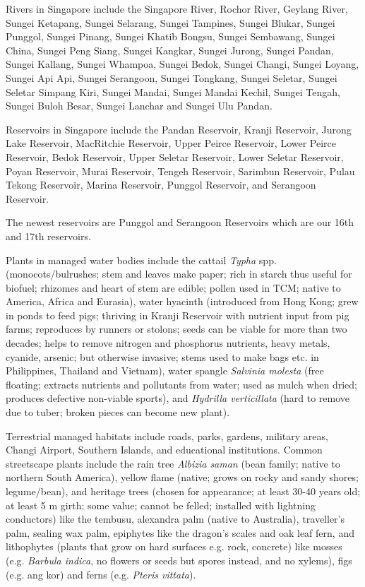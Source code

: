 \documentclass{slnotes}
\newcommand{\scn}[1]{\textit{#1}}
\begin{document}
Rivers in Singapore include the Singapore River, Rochor River, Geylang River, Sungei Ketapang, Sungei Selarang, Sungei Tampines, Sungei Blukar, Sungei Punggol, Sungei Pinang, Sungei Khatib Bongsu, Sungei Sembawang, Sungei China, Sungei Peng Siang, Sungei Kangkar, Sungei Jurong, Sungei Pandan, Sungei Kallang, Sungei Whampoa, Sungei Bedok, Sungei Changi, Sungei Loyang, Sungei Api Api, Sungei Serangoon, Sungei Tongkang, Sungei Seletar, Sungei Seletar Simpang Kiri, Sungei Mandai, Sungei Mandai Kechil, Sungei Tengah, Sungei Buloh Besar, Sungei Lanchar and Sungei Ulu Pandan.

Reservoirs in Singapore include the Pandan Reservoir, Kranji Reservoir, Jurong Lake Reservoir, MacRitchie Reservoir, Upper Peirce Reservoir, Lower Peirce Reservoir, Bedok Reservoir, Upper Seletar Reservoir, Lower Seletar Reservoir, Poyan Reservoir, Murai Reservoir, Tengeh Reservoir, Sarimbun Reservoir, Pulau Tekong Reservoir, Marina Reservoir, Punggol Reservoir, and Serangoon Reservoir.

The newest reservoirs are Punggol and Serangoon Reservoirs which are our 16th and 17th reservoirs.

Plants in managed water bodies include the cattail \scn{Typha} spp. (monocots/bulrushes; stem and leaves make paper; rich in starch thus useful for biofuel; rhizomes and heart of stem are edible; pollen used in TCM; native to America, Africa and Eurasia), water hyacinth (introduced from Hong Kong; grew in ponds to feed pigs; thriving in Kranji Reservoir with nutrient input from pig farms; reproduces by runners or stolons; seeds can be viable for more than two decades; helps to remove nitrogen and phosphorus nutrients, heavy metals, cyanide, arsenic; but otherwise invasive; stems used to make bags etc. in Philippines, Thailand and Vietnam), water spangle \scn{Salvinia molesta} (free floating; extracts nutrients and pollutants from water; used as mulch when dried; produces defective non-viable sports), and \scn{Hydrilla verticillata} (hard to remove due to tuber; broken pieces can become new plant).

Terrestrial managed habitats include roads, parks, gardens, military areas, Changi Airport, Southern Islands, and educational institutions. Common streetscape plants include the rain tree \scn{Albizia saman} (bean family; native to northern South America), yellow flame (native; grows on rocky and sandy shores; legume/bean), and heritage trees (chosen for appearance; at least 30-40 years old; at least 5 m girth; some value; cannot be felled; installed with lightning conductors) like the tembusu, alexandra palm (native to Australia), traveller's palm, sealing wax palm, epiphytes like the dragon's scales and oak leaf fern, and lithophytes (plants that grow on hard surfaces e.g. rock, concrete) like mosses (e.g. \scn{Barbula indica}, no flowers or seeds but spores instead, and no xylems), figs (e.g. ang kor) and ferns (e.g. \scn{Pteris vittata}).
\end{document}
